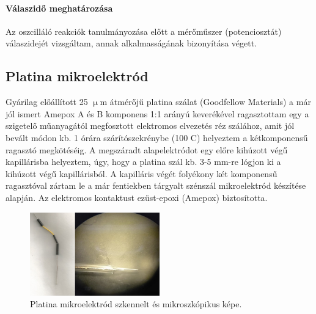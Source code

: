 \paragraph{Válaszidő meghatározása}
Az oszcilláló reakciók tanulmányozása előtt a mérőműszer (potenciosztát) válaszidejét vizsgáltam, annak alkalmasságának bizonyítása végett.
\subsection{Platina mikroelektród}
Gyárilag előállított 25 $\upmu$m átmérőjű platina szálat (Goodfellow Materials) a már jól ismert Amepox A és B komponens 1:1 arányú keverékével ragasztottam egy a szigetelő műanyagától megfosztott elektromos elvezetés réz szálához, amit jól bevált módon kb. 1 órára szárítószekrénybe (100 \textdegree C) helyeztem a kétkomponensű ragasztó megkötéséig.  A megszáradt alapelektródot egy előre kihúzott végű kapillárisba helyeztem, úgy, hogy a platina szál kb. 3-5 mm-re lógjon ki a kihúzott végű kapillárisból. A kapilláris végét folyékony két komponensű ragasztóval zártam le a már fentiekben tárgyalt szénszál mikroelektród készítése alapján. Az elektromos kontaktust ezüst-epoxi (Amepox) biztosította.
\begin{figure}[h]
\centering
\includegraphics[width=0.5\textwidth]{img/platina.png}
\caption{Platina mikroelektród szkennelt és mikroszkópikus képe.}
\label{fig:ionophores}
\end{figure}

